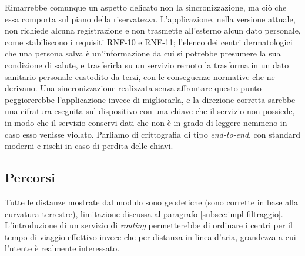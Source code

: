 Rimarrebbe comunque un aspetto delicato non la sincronizzazione, ma ciò che essa comporta sul piano della riservatezza.
L'applicazione, nella versione attuale, non richiede alcuna registrazione e non trasmette all'esterno alcun dato personale,
come stabiliscono i requisiti RNF-10 e RNF-11; l'elenco dei centri dermatologici che una persona salva è un'informazione
da cui si potrebbe presumere la sua condizione di salute, e trasferirla su un servizio remoto la trasforma in un dato
sanitario personale custodito da terzi, con le conseguenze normative che ne derivano.
Una sincronizzazione realizzata senza affrontare questo punto peggiorerebbe l'applicazione invece di migliorarla, e la direzione
corretta sarebbe una cifratura eseguita sul dispositivo con una chiave che il servizio non possiede, in modo che il servizio
conservi dati che non è in grado di leggere nemmeno in caso esso venisse violato.
Parliamo di crittografia di tipo \textit{end-to-end}, con standard moderni e rischi in caso di perdita delle chiavi.

\subsection{Percorsi}\label{subsec:futuro-percorsi}

Tutte le distanze mostrate dal modulo sono geodetiche (sono corrette in base alla curvatura terrestre), limitazione
discussa al paragrafo \ref{subsec:impl-filtraggio}.
L'introduzione di un servizio di \textit{routing} permetterebbe di ordinare i centri per il tempo di viaggio effettivo
invece che per distanza in linea d'aria, grandezza a cui l'utente è realmente interessato.

